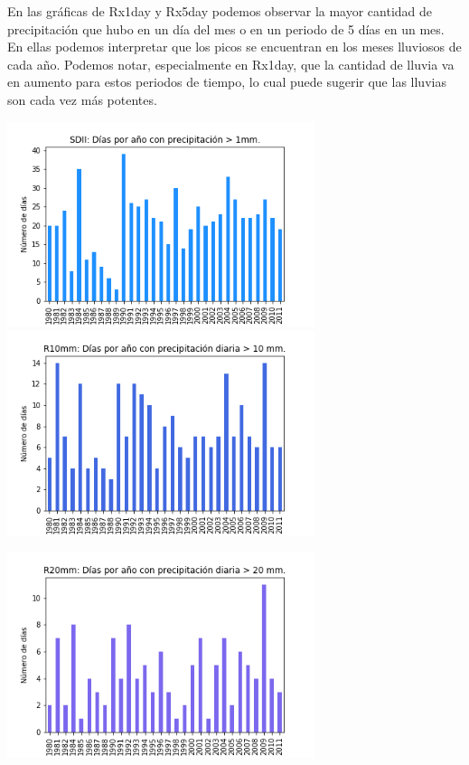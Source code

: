 \documentclass[letterpaper,12pt]{article}
\begin{document}
En las gráficas de Rx1day y Rx5day podemos observar la mayor cantidad de precipitación que hubo en un día del mes o en un periodo de 5 días en un mes. En ellas podemos interpretar que los picos se encuentran en los meses lluviosos de cada año. Podemos notar, especialmente en Rx1day, que la cantidad de lluvia va en aumento para estos periodos de tiempo, lo cual puede sugerir que las lluvias son cada vez más potentes. 


\begin{center}
	\includegraphics[height=6cm]{grafica12.png}\hspace*{\fill}
	\label{graf12}
   \includegraphics[height=6cm]{grafica13.png}
    \label{graf13}
\end{center}

\begin{center}
\includegraphics[height=6cm]{grafica14.png}
    \label{graf14}
\end{center}
\end{document}
